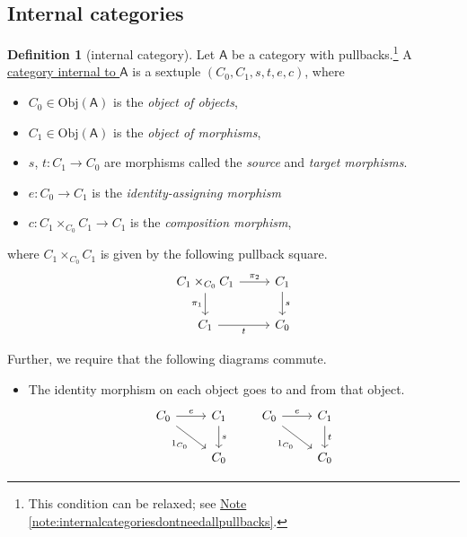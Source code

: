 \documentclass[a4paper]{report}
\newcommand{\defn}[1]{\ul{#1}}
\newcommand{\Obj}{\mathrm{Obj}}
\theoremstyle{definition}
\newtheorem{definition}{Definition}[section]
\theoremstyle{plain}
\theoremstyle{remark}
\begin{document}
\subsection{Internal categories}
\begin{definition}[internal category]
  \label{def:internalcategory}
  Let $\mathsf{A}$ be a category with pullbacks.\footnote{This condition can be relaxed; see \hyperref[note:internalcategoriesdontneedallpullbacks]{Note \ref*{note:internalcategoriesdontneedallpullbacks}}.} A \defn{category internal to $\mathsf{A}$} is a sextuple $(C_{0}, C_{1}, s, t, e, c)$, where
  \begin{itemize}
    \item $C_{0} \in \Obj(\mathsf{A})$ is the \emph{object of objects}, 
    \item $C_{1} \in \Obj(\mathsf{A})$ is the \emph{object of morphisms},
    \item $s$, $t\colon C_{1} \to C_{0}$ are morphisms called the \emph{source} and \emph{target morphisms}.
    \item $e\colon C_{0} \to C_{1}$ is the \emph{identity-assigning morphism}
    \item $c\colon C_{1} \times_{C_{0}} C_{1} \to C_{1}$ is the \emph{composition morphism},
  \end{itemize}
  where $C_{1} \times_{C_{0}} C_{1}$ is given by the following pullback square.
  \begin{equation*}
    \begin{tikzcd}
      C_{1} \times_{C_{0}} C_{1}
      \arrow[r, "\pi_{2}"]
      \arrow[d, swap, "\pi_{1}"]
      & C_{1}
      \arrow[d, "s"]
      \\
      C_{1}
      \arrow[r, swap, "t"]
      & C_{0}
    \end{tikzcd}
  \end{equation*}

  Further, we require that the following diagrams commute.
  \begin{itemize}
    \item The identity morphism on each object goes to and from that object.
      \begin{equation*}
        \begin{tikzcd}
          C_{0} 
          \arrow[r, "e"]
          \arrow[dr, swap, "1_{C_{0}}"]
          & C_{1} 
          \arrow[d, "s"]
          \\
          & C_{0}
        \end{tikzcd}
        \qquad
        \begin{tikzcd}
          C_{0} 
          \arrow[r, "e"]
          \arrow[dr, swap, "1_{C_{0}}"]
          & C_{1} 
          \arrow[d, "t"]
          \\
          & C_{0}
        \end{tikzcd}
      \end{equation*}


\end{itemize}
\end{definition}
\end{document}
